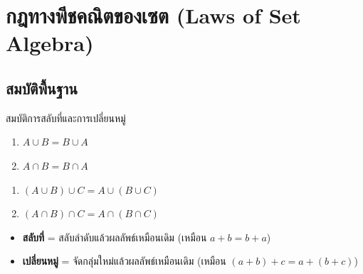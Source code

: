 \documentclass[11pt, aspectratio=169]{beamer}
\begin{document}
\section{กฎทางพีชคณิตของเซต (Laws of Set Algebra)}

\subsection{สมบัติพื้นฐาน}

\begin{frame}{สมบัติการสลับที่และการเปลี่ยนหมู่}
  \begin{explanation}
    \begin{enumerate}
      \item $A \cup B = B \cup A$
      \item $A \cap B = B \cap A$
    \end{enumerate}
  \end{explanation}

  \begin{explanation}
    \begin{enumerate}
      \item $(A \cup B) \cup C = A \cup (B \cup C)$
      \item $(A \cap B) \cap C = A \cap (B \cap C)$
    \end{enumerate}
  \end{explanation}

  \begin{intuition}[จำง่าย ๆ]
    \begin{itemize}
      \item \textbf{สลับที่} = สลับลำดับแล้วผลลัพธ์เหมือนเดิม (เหมือน $a+b = b+a$)
      \item \textbf{เปลี่ยนหมู่} = จัดกลุ่มใหม่แล้วผลลัพธ์เหมือนเดิม (เหมือน $(a+b)+c = a+(b+c)$)
    \end{itemize}
  \end{intuition}
\end{frame}
\end{document}
